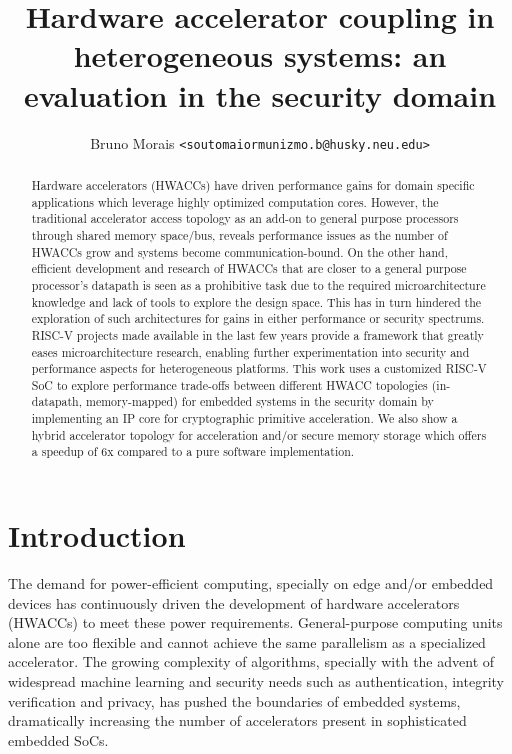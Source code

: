 \documentclass[10pt,conference]{IEEEtran}
\title{\textbf{Hardware accelerator coupling in heterogeneous systems: an evaluation in the
    security domain}}
\author{Bruno Morais \texttt{<soutomaiormunizmo.b@husky.neu.edu>}}
\date{}
\begin{document}
\maketitle

\begin{abstract}
  Hardware accelerators (HWACCs) have driven performance gains for
  domain specific applications which leverage highly optimized computation
  cores. However, the traditional accelerator access topology as an add-on to
  general purpose processors through shared memory space/bus, reveals performance
  issues as the number of HWACCs grow and systems become
  communication-bound.
  On the other hand, efficient development and research of HWACCs
  that are closer to a general purpose processor's datapath is seen as a
  prohibitive task due to the required microarchitecture knowledge and lack of
  tools to explore the design space. This has in turn hindered the exploration of
  such architectures for gains in either performance or security spectrums.
  RISC-V projects made available in the last few years provide a framework that
  greatly eases microarchitecture research, enabling further experimentation
  into security and performance aspects for heterogeneous platforms.
  This work uses a customized RISC-V SoC to explore performance trade-offs
  between different HWACC topologies (in-datapath, memory-mapped) for embedded
  systems in the security domain by implementing an IP core for cryptographic
  primitive acceleration. We also show a hybrid accelerator topology for
  acceleration and/or secure memory storage which offers a speedup of 6x compared to a
  pure software implementation.

\end{abstract}

\section{Introduction}

The demand for power-efficient computing, specially on edge and/or embedded
devices has continuously driven the development of hardware accelerators
(HWACCs) to meet these power requirements. General-purpose computing units alone
are too flexible and cannot achieve the same parallelism as a specialized
accelerator. The growing complexity of algorithms, specially with the advent of
widespread machine learning and security needs such as authentication, integrity
verification and privacy, has pushed the boundaries of embedded systems,
dramatically increasing the number of accelerators present in sophisticated
embedded SoCs.
\end{document}
